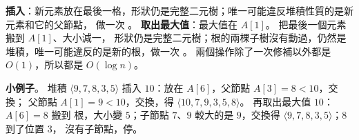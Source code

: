 \begin{pastsoln}
\textbf{插入}：新元素放在最後一格，形狀仍是完整二元樹；唯一可能違反堆積性質的是新元素和它的父節點，
做一次 。 \textbf{取出最大值}：最大值在 $A[1]$。 把最後一個元素搬到 $A[1]$、大小減一，
形狀仍是完整二元樹；根的兩棵子樹沒有動過，仍然是堆積，唯一可能違反的是新的根，做一次
。 兩個操作除了一次修補以外都是 $O(1)$，所以都是 $O(\log n)$。

\textbf{小例子}。 堆積 $\langle 9, 7, 8, 3, 5\rangle$ 插入 $10$：放在 $A[6]$，父節點 $A[3] = 8 < 10$，交換；
父節點 $A[1] = 9 < 10$，交換，得 $\langle 10, 7, 9, 3, 5, 8\rangle$。 再取出最大值 $10$：$A[6] = 8$ 搬到
根，大小變 $5$；子節點 $7$、$9$ 較大的是 $9$，交換得 $\langle 9, 7, 8, 3, 5\rangle$；$8$ 到了位置 $3$，
沒有子節點，停。
\end{pastsoln}

